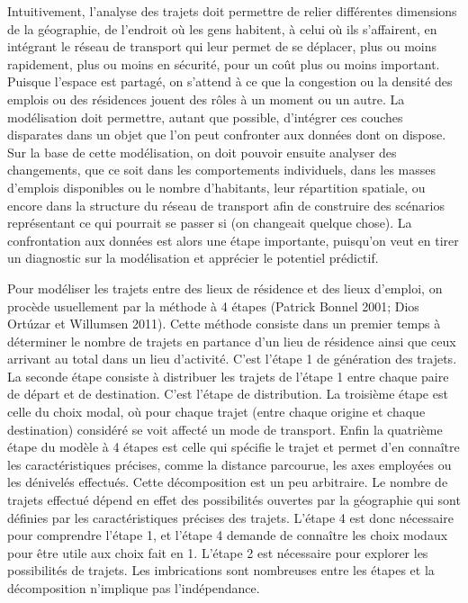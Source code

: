 \documentclass[
  10pt,
  a4paper,
  numbers=noendperiod,
  DIV=12]{scrartcl}
\begin{document}
Intuitivement, l'analyse des trajets doit permettre de relier
différentes dimensions de la géographie, de l'endroit où les gens
habitent, à celui où ils s'affairent, en intégrant le réseau de
transport qui leur permet de se déplacer, plus ou moins rapidement, plus
ou moins en sécurité, pour un coût plus ou moins important. Puisque
l'espace est partagé, on s'attend à ce que la congestion ou la densité
des emplois ou des résidences jouent des rôles à un moment ou un autre.
La modélisation doit permettre, autant que possible, d'intégrer ces
couches disparates dans un objet que l'on peut confronter aux données
dont on dispose. Sur la base de cette modélisation, on doit pouvoir
ensuite analyser des changements, que ce soit dans les comportements
individuels, dans les masses d'emplois disponibles ou le nombre
d'habitants, leur répartition spatiale, ou encore dans la structure du
réseau de transport afin de construire des scénarios représentant ce qui
pourrait se passer si (on changeait quelque chose). La confrontation aux
données est alors une étape importante, puisqu'on veut en tirer un
diagnostic sur la modélisation et apprécier le potentiel prédictif.

Pour modéliser les trajets entre des lieux de résidence et des lieux
d'emploi, on procède usuellement par la méthode à 4 étapes (Patrick
Bonnel 2001; Dios Ortúzar et Willumsen 2011). Cette méthode consiste
dans un premier temps à déterminer le nombre de trajets en partance d'un
lieu de résidence ainsi que ceux arrivant au total dans un lieu
d'activité. C'est l'étape 1 de génération des trajets. La seconde étape
consiste à distribuer les trajets de l'étape 1 entre chaque paire de
départ et de destination. C'est l'étape de distribution. La troisième
étape est celle du choix modal, où pour chaque trajet (entre chaque
origine et chaque destination) considéré se voit affecté un mode de
transport. Enfin la quatrième étape du modèle à 4 étapes est celle qui
spécifie le trajet et permet d'en connaître les caractéristiques
précises, comme la distance parcourue, les axes employées ou les
dénivelés effectués. Cette décomposition est un peu arbitraire. Le
nombre de trajets effectué dépend en effet des possibilités ouvertes par
la géographie qui sont définies par les caractéristiques précises des
trajets. L'étape 4 est donc nécessaire pour comprendre l'étape 1, et
l'étape 4 demande de connaître les choix modaux pour être utile aux
choix fait en 1. L'étape 2 est nécessaire pour explorer les possibilités
de trajets. Les imbrications sont nombreuses entre les étapes et la
décomposition n'implique pas l'indépendance.
\end{document}
